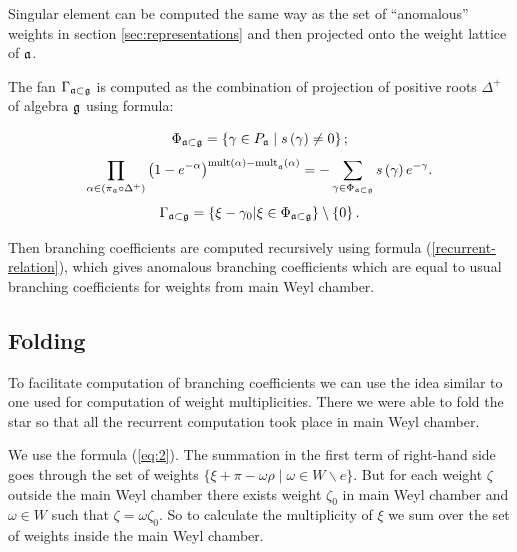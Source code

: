 \documentclass[a4paper,12pt]{article}
\theoremstyle{definition} \newtheorem{Def}{Definition}
\begin{document}
Singular element can be computed the same way as the set of ``anomalous''
weights in section \ref{sec:representations} and then projected onto
the weight lattice of $\frak{a}$. 

The fan $\Gamma_{\frak{a}\subset \frak{g}}$ is computed as the
combination of projection of positive roots $\Delta^{+}$ of algebra
$\frak{g}$ using formula:

\begin{equation}
  \label{phi-d}
  \Phi _{\frak{a}\subset \frak{g}}=\left\{ \gamma \in P_{\frak{a}}\mid s\left(
      \gamma \right) \neq 0\right\} ;  
\end{equation}
\begin{equation}
  \label{fan-d}
  \prod_{\alpha \in \left( \pi _{\frak{a}}\circ \Delta ^{+}\right) }\left(
    1-e^{-\alpha }\right) ^{\mathrm{{mult}\left( \alpha \right) -{mult}}_{\frak{a%
      }}\mathrm{\left( \alpha \right) }}=-\sum_{\gamma \in \Phi _{\frak{a}\subset 
      \frak{g}}}s\left( \gamma \right) e^{-\gamma }.  
\end{equation}
\begin{equation}
  \label{fan-defined}
  \Gamma _{\frak{a}\subset \frak{g}}=\left\{ \xi -\gamma _{0}|\xi \in \Phi _{%
      \frak{a}\subset \frak{g}}\right\} \setminus \left\{ 0\right\} .
\end{equation}

Then branching coefficients are computed recursively using formula
(\ref{recurrent-relation}), which gives anomalous branching
coefficients which are equal to usual branching coefficients for
weights from main Weyl chamber. 

\subsection{Folding}
\label{sec:folding}

To facilitate computation of branching coefficients we can use the
idea similar to one used for computation of weight multiplicities.
There we were able to fold the star so that all the recurrent
computation took place in main Weyl chamber. 

We use the formula (\ref{eq:2}). The summation in the first term of
right-hand side goes through the set of weights $\{\xi+\pi-\omega
\rho\;|\;\omega\in W\backslash e\}$.
But for each weight $\zeta$ outside the main Weyl chamber there exists
weight $\zeta_0$ in main Weyl chamber and $\omega\in W$ such that
$\zeta=\omega \zeta_0$. So to calculate the multiplicity of $\xi$ we
sum over the set of weights inside the main Weyl chamber.
\end{document}
